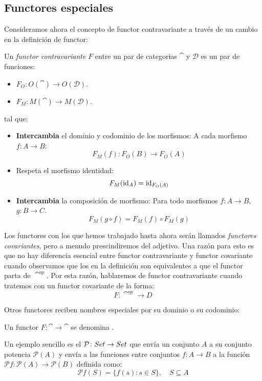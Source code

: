 \subsection{Functores especiales}
Consideramos ahora el concepto de functor contravariante a través de un cambio en la definición de functor:
\begin{definition}\label{def:cofunctor}
Un \emph{functor contravariante} $F$ entre un par de categorias $\cat$ y $\mathcal{D}$ es un par de funciones:
\begin{itemize}
\item $F_O : O(\cat) \to O(\mathcal{D})$.
\item $F_M : M(\cat) \to M(\mathcal{D})$.
\end{itemize}
tal que:
\begin{itemize}
\item \textbf{Intercambia} el dominio y codominio de los morfismos: A cada morfismo $f : A \to B$:
\[ F_M(f) : F_O(B) \to F_O(A) \]
\item Respeta el morfismo identidad:
\[ F_M(\operatorname{id}_A) = \operatorname{id}_{F_O(A)} \]
\item \textbf{Intercambia} la composición de morfismo: Para todo morfismos $f : A \to B$, $g : B \to C$.
\[ F_M(g \circ f) = F_M(f) \circ F_M(g) \]
\end{itemize}
\end{definition}

Los functores con los que hemos trabajado hasta ahora serán llamados \emph{functores covariantes}, pero a menudo prescindiremos del adjetivo.
Una razón para esto es que no hay diferencia esencial entre functor contravariante y functor covariante cuando observamos que los  en la definición son equivalentes a que el functor parta de $\cat^{op}$.
Por esta razón, hablaremos de functor contravariante cuando tratemos con un functor covariante de la forma:
\[ F \colon \cat^{op} \to D \]

Otros functores reciben nombres especiales por su dominio o su codominio:
\begin{definition}
Un functor $F \colon \cat \to \cat$ se denomina .
\end{definition}
\begin{example}
Un ejemplo sencillo es el  $\mathcal{P} \colon {Set} \to {Set}$ que envía un conjunto $A$ a su conjunto potencia $\mathcal{P}(A)$ y envía a las funciones entre conjuntos $f \colon A \to B$ a la función $\mathcal{P} f \colon \mathcal{P}(A) \to \mathcal{P}(B)$ definida como:
\[ \mathcal{P} f (S) = \{f(s) \colon s \in S\}, \quad S \subseteq A \]
\end{example}

